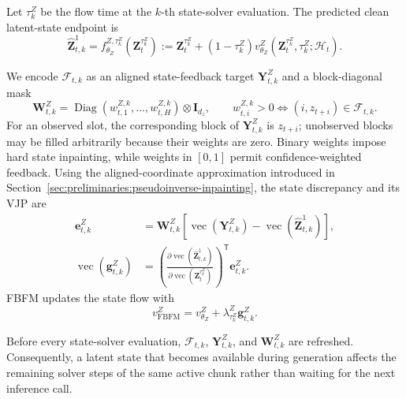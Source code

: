 Let $\tau_k^Z$ be the flow time at the $k$-th state-solver evaluation. The
predicted clean latent-state endpoint is
\begin{equation}
    \hat{\mathbf Z}_{t,k}^1
    =
    f_{\theta_Z}^{Z,\tau_k^Z}(\mathbf Z_t^{\tau_k^Z})
    :=
    \mathbf Z_t^{\tau_k^Z}
    +(1-\tau_k^Z)
    v_{\theta_Z}^Z
    \!\left(
        \mathbf Z_t^{\tau_k^Z},\tau_k^Z;\mathcal H_t
    \right).
    \label{eq:state-clean-endpoint}
\end{equation}

We encode $\mathcal F_{t,k}$ as an aligned state-feedback target
$\mathbf Y_{t,k}^Z$ and a block-diagonal mask
\begin{equation}
    \mathbf W_{t,k}^Z
    =
    \operatorname{Diag}
    \!\left(w_{t,1}^{Z,k},\ldots,w_{t,H}^{Z,k}\right)
    \otimes\mathbf I_{d_z},
    \qquad
    w_{t,i}^{Z,k}>0
    \Longleftrightarrow
    (i,z_{t+i})\in\mathcal F_{t,k}.
    \label{eq:dynamic-state-mask}
\end{equation}
For an observed slot, the corresponding block of $\mathbf Y_{t,k}^Z$ is
$z_{t+i}$; unobserved blocks may be filled arbitrarily because their weights are
zero. Binary weights impose hard state inpainting, while weights in $[0,1]$ permit
confidence-weighted feedback. Using the aligned-coordinate approximation introduced
in Section~\ref{sec:preliminaries:pseudoinverse-inpainting}, the state discrepancy
and its VJP are
\begin{align}
    \mathbf e_{t,k}^Z
    &=
    \mathbf W_{t,k}^Z
    \left[
        \operatorname{vec}(\mathbf Y_{t,k}^Z)
        -
        \operatorname{vec}(\hat{\mathbf Z}_{t,k}^1)
    \right],
    \label{eq:state-feedback-error}\\
    \operatorname{vec}(\mathbf g_{t,k}^Z)
    &=
    \left(
        \frac{\partial\operatorname{vec}(\hat{\mathbf Z}_{t,k}^1)}
             {\partial\operatorname{vec}(\mathbf Z_t^{\tau_k^Z})}
    \right)^{\mathsf T}
    \mathbf e_{t,k}^Z.
    \label{eq:state-feedback-vjp}
\end{align}
FBFM updates the state flow with
\begin{equation}
    v_{\mathrm{FBFM}}^Z
    =
    v_{\theta_Z}^Z
    +\lambda_{\tau_k^Z}^Z\mathbf g_{t,k}^Z.
    \label{eq:guided-state-flow}
\end{equation}

Before every state-solver evaluation, $\mathcal F_{t,k}$,
$\mathbf Y_{t,k}^Z$, and $\mathbf W_{t,k}^Z$ are refreshed. Consequently, a
latent state that becomes available during generation affects the remaining solver
steps of the same active chunk rather than waiting for the next inference call.

